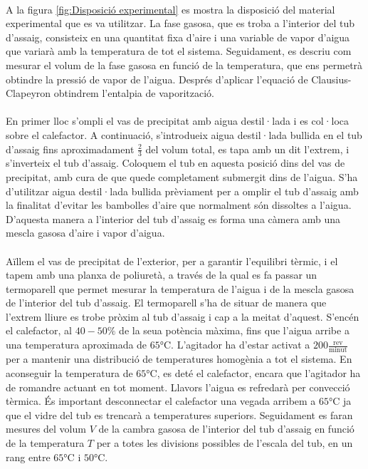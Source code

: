 \documentclass{article}
\begin{document}
    \hfill{}\\
    A la figura \ref{fig:Disposició experimental} es mostra la disposició del material experimental que es va utilitzar. La fase gasosa, que es troba a l’interior del tub d’assaig, consisteix en una quantitat fixa d’aire i una variable de vapor d’aigua que variarà amb la temperatura de tot el sistema. Seguidament, es descriu com mesurar el volum de la fase gasosa en funció de la temperatura, que ens permetrà obtindre la pressió de vapor de l’aigua. Després d’aplicar l’equació de Clausius-Clapeyron obtindrem l’entalpia de vaporització. \\ \\En primer lloc s’ompli el vas de precipitat amb aigua destil·lada i es col·loca sobre el calefactor. A continuació, s'introdueix aigua destil·lada bullida en el tub d’assaig fins aproximadament $\frac{2}{3}$ del volum total, es tapa amb un dit l’extrem, i s’inverteix el tub d'assaig. Coloquem el tub en aquesta posició dins del vas de precipitat, amb cura de que quede completament submergit dins de l’aigua. S’ha d’utilitzar aigua destil·lada bullida prèviament per a omplir el tub d’assaig amb la finalitat d’evitar les bambolles d’aire que normalment són dissoltes a l'aigua. D’aquesta manera a l’interior del tub d’assaig es forma una càmera amb una mescla gasosa d’aire i vapor d’aigua. \\ \\ Aïllem el vas de precipitat de l’exterior, per a garantir l’equilibri tèrmic, i el tapem amb una planxa de poliuretà, a través de la qual es fa passar un termoparell que permet mesurar la temperatura de l’aigua i de la mescla gasosa de l’interior del tub d’assaig. El termoparell s’ha de situar de manera que l’extrem lliure es trobe pròxim al tub d’assaig i cap a la meitat d’aquest. S’encén el calefactor, al $40-50\%$ de la seua potència màxima, fins que l’aigua arribe a una temperatura aproximada de $65\si{\celsius}$. L’agitador ha d’estar activat a $200 \frac{\text{rev}}{\text{minut}}$ per a mantenir una distribució de temperatures homogènia a tot el sistema. 
    \newpage
    En aconseguir la temperatura de $65\si{\celsius}$, es deté el calefactor, encara que l’agitador ha de romandre actuant en tot moment. Llavors l’aigua es refredarà per convecció tèrmica. És important desconnectar el calefactor una vegada arribem a $65\si{\celsius}$ ja que el vidre del tub es trencarà a temperatures superiors. Seguidament es faran mesures del volum $V$ de la cambra gasosa de l’interior del tub d’assaig en funció de la temperatura $T$ per a totes les divisions possibles de l’escala del tub, en un rang entre $65\si{\celsius}$ i $50\si{\celsius}$.\\ \vspace{-0.65cm}
\end{document}
